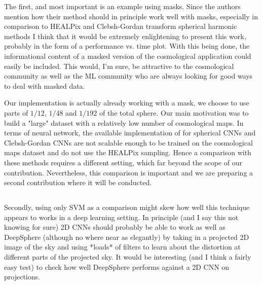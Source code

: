 \documentclass[12pt,a4paper]{article}
\newcommand{\nati}[1]{{\color[rgb]{.1,.6,.1}{NP: #1}}}
\newcommand{\todo}[1]{{\color[rgb]{.6,.1,.6}{TODO: #1}}}
\newcommand{\1}{\b{1}}              %
\newcommand{\0}{\b{0}}              %
\begin{document}
\begin{mdframed}[style=comment] 
The first, and most important is an example using masks. Since the authors mention how their method should in principle work well with masks, especially in comparison to HEALPix and Clebsh-Gordan transform spherical harmonic methods I think that it would be extremely enlightening to present this work, probably in the form of a performance vs. time plot. With this being done, the informational content of a masked version of the cosmological application could easily be included. This would, I'm sure, be attractive to the cosmological community as well as the ML community who are always looking for good ways to deal with masked data.
\end{mdframed}
\todo{Assigned: @Michael, @Nati}
Our implementation is actually already working with a mask, we choose to use parts of $1/12$, $1/48$ and $1/192$ of the total sphere. Our main motivation was to build a "large" dataset with a relatively low number of cosmological maps. 
In terms of neural network, the available implementation of \cite{cohen2018sphericalcnn,kondor2018clebsch} for spherical CNNs and Clebsh-Gordan CNNs are not scalable enough to be trained on the cosmological maps dataset and do not use the HEALPix sampling. Hence a comparison with these methods requires a different setting, which far beyond the scope of our contribution. Nevertheless, this comparison is important and we are preparing a second contribution where it will be conducted.

\nati{We could compare the price of one convolution. What do you think? We can write the theoretical complexity. This is a sensitive point! }

\subsection{}

\begin{mdframed}[style=comment] 
Secondly, using only SVM as a comparison might skew how well this technique appears to works in a deep learning setting. In principle (and I say this not knowing for sure) 2D CNNs should probably be able to work as well as DeepSphere (although no where near as elegantly) by taking in a projected 2D image of the sky and using *loads* of filters to learn about the distortion at different parts of the projected sky. It would be interesting (and I think a fairly easy test) to check how well DeepSphere performs against a 2D CNN on projections. 
\end{mdframed}
\todo{Assigned: @Nati, @Michael, @Tomek}
\end{document}

